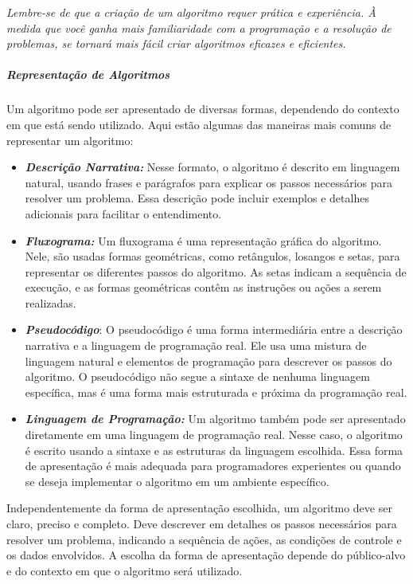 \documentclass[a4paper, 12pt, onecolumn,singlespacing]{article}
\begin{document}
	
	\textit{Lembre-se de que a criação de um algoritmo requer prática e experiência. À medida que você ganha mais familiaridade com a programação e a resolução de problemas, se tornará mais fácil criar algoritmos eficazes e eficientes.}
	
	\subparagraph{Representação de Algoritmos}
	
	Um algoritmo pode ser apresentado de diversas formas, dependendo do contexto em que está sendo utilizado. Aqui estão algumas das maneiras mais comuns de representar um algoritmo:
	
	\begin{itemize}
		\item \textbf{\textit{Descrição Narrativa:}} Nesse formato, o algoritmo é descrito em linguagem natural, usando frases e parágrafos para explicar os passos necessários para resolver um problema. Essa descrição pode incluir exemplos e detalhes adicionais para facilitar o entendimento.
		
		\item \textbf{\textit{Fluxograma:}} Um fluxograma é uma representação gráfica do algoritmo. Nele, são usadas formas geométricas, como retângulos, losangos e setas, para representar os diferentes passos do algoritmo. As setas indicam a sequência de execução, e as formas geométricas contêm as instruções ou ações a serem realizadas.
		
		\item \textbf{\textit{Pseudocódigo}}: O pseudocódigo é uma forma intermediária entre a descrição narrativa e a linguagem de programação real. Ele usa uma mistura de linguagem natural e elementos de programação para descrever os passos do algoritmo. O pseudocódigo não segue a sintaxe de nenhuma linguagem específica, mas é uma forma mais estruturada e próxima da programação real.
		
		\item \textbf{\textit{Linguagem de Programação:}} Um algoritmo também pode ser apresentado diretamente em uma linguagem de programação real. Nesse caso, o algoritmo é escrito usando a sintaxe e as estruturas da linguagem escolhida. Essa forma de apresentação é mais adequada para programadores experientes ou quando se deseja implementar o algoritmo em um ambiente específico.
		
	\end{itemize}
	
	Independentemente da forma de apresentação escolhida, um algoritmo deve ser claro, preciso e completo. Deve descrever em detalhes os passos necessários para resolver um problema, indicando a sequência de ações, as condições de controle e os dados envolvidos. A escolha da forma de apresentação depende do público-alvo e do contexto em que o algoritmo será utilizado.
	
\end{document}
